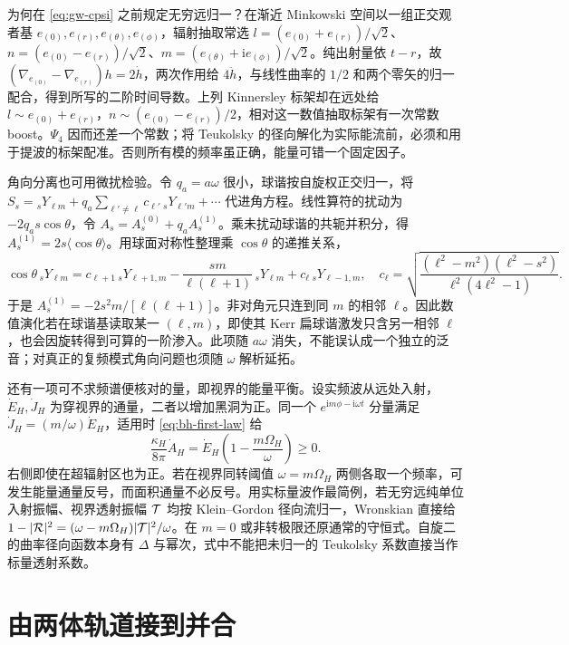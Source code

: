 为何在 \eqref{eq:gw-cpsi} 之前规定无穷远归一？在渐近 Minkowski 空间以一组正交观者基 $e_{(0)},e_{(r)},e_{(\theta)},e_{(\phi)}$，辐射抽取常选 $l=(e_{(0)}+e_{(r)})/\sqrt2$、$n=(e_{(0)}-e_{(r)})/\sqrt2$、$m=(e_{(\theta)}+\mathrm i e_{(\phi)})/\sqrt2$。纯出射量依 $t-r$，故 $(\nabla_{e_{(0)}}-\nabla_{e_{(r)}})h=2\dot h$，两次作用给 $4\ddot h$，与线性曲率的 $1/2$ 和两个零矢的归一配合，得到所写的二阶时间导数。上列 Kinnersley 标架却在远处给 $l\sim e_{(0)}+e_{(r)}$，$n\sim(e_{(0)}-e_{(r)})/2$，相对这一数值抽取标架有一次常数 boost。$\Psi_4$ 因而还差一个常数；将 Teukolsky 的径向解化为实际能流前，必须和用于提波的标架配准。否则所有模的频率虽正确，能量可错一个固定因子。

角向分离也可用微扰检验。令 $q_a=a\omega$ 很小，球谐按自旋权正交归一，将 $S_s={}_sY_{\ell m}+q_a\sum_{\ell'\ne\ell}c_{\ell'}\,{}_sY_{\ell'm}+\cdots$ 代进角方程。线性算符的扰动为 $-2q_a s\cos\theta$，令 $A_s=A_s^{(0)}+q_a A_s^{(1)}$。乘未扰动球谐的共轭并积分，得 $A_s^{(1)}=2s\langle\cos\theta\rangle$。用球面对称性整理乘 $\cos\theta$ 的递推关系，
\[
 \cos\theta\,{}_sY_{\ell m}=c_{\ell+1}\,{}_sY_{\ell+1,m}
 -\frac{sm}{\ell(\ell+1)}\,{}_sY_{\ell m}
 +c_\ell\,{}_sY_{\ell-1,m},\quad
 c_\ell=\sqrt{\frac{(\ell^2-m^2)(\ell^2-s^2)}{\ell^2(4\ell^2-1)}} .
\]
于是 $A_s^{(1)}=-2s^2m/[\ell(\ell+1)]$。非对角元只连到同 $m$ 的相邻 $\ell$。因此数值演化若在球谐基读取某一 $(\ell,m)$，即使其 Kerr 扁球谐激发只含另一相邻 $\ell$，也会因旋转得到可算的一阶渗入。此项随 $a\omega$ 消失，不能误认成一个独立的泛音；对真正的复频模式角向问题也须随 $\omega$ 解析延拓。

还有一项可不求频谱便核对的量，即视界的能量平衡。设实频波从远处入射，$\dot E_H,\dot J_H$ 为穿视界的通量，二者以增加黑洞为正。同一个 $e^{\mathrm i m\phi-\mathrm i\omega t}$ 分量满足 $\dot J_H=(m/\omega)\dot E_H$，适用时 \eqref{eq:bh-first-law} 给
\[
 \frac{\kappa_H}{8\pi}\dot A_H
 =\dot E_H\left(1-\frac{m\Omega_H}{\omega}\right)\ge0 .
\]
右侧即使在超辐射区也为正。若在视界同转阈值 $\omega=m\Omega_H$ 两侧各取一个频率，可发生能量通量反号，而面积通量不必反号。用实标量波作最简例，若无穷远纯单位入射振幅、视界透射振幅 ${\cal T}$ 均按 Klein--Gordon 径向流归一，Wronskian 直接给 $1-|{\cal R}|^2=(\omega-m\Omega_H)|{\cal T}|^2/\omega$。在 $m=0$ 或非转极限还原通常的守恒式。自旋二的曲率径向函数本身有 $\Delta$ 与幂次，式中不能把未归一的 Teukolsky 系数直接当作标量透射系数。

\section{由两体轨道接到并合}\label{sec:gw-cbinary}

